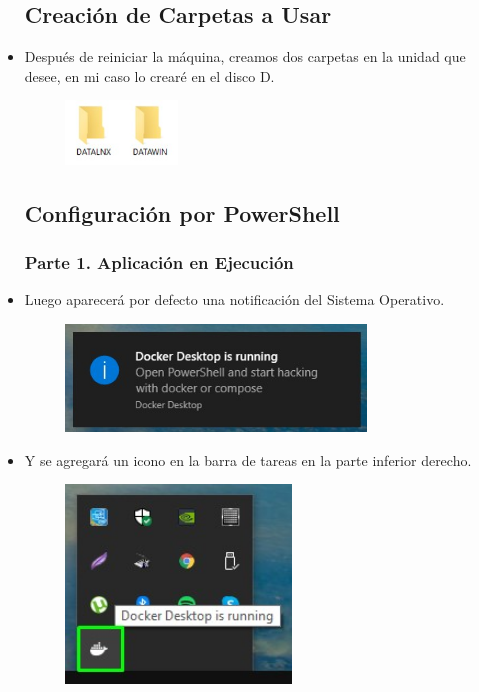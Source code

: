 \begin{itemize}
		\subsection{Creación de Carpetas a Usar}
			\item Después de reiniciar la máquina, creamos dos carpetas en la unidad que desee, en mi caso lo crearé en el disco D.
				\begin{figure}[htb]
					\begin{center}
						\includegraphics[width=3cm]{./Imagenes/CarpetasCreadas}
					\end{center}
				\end{figure}
				\vspace{3cm}
		\subsection{Configuración por PowerShell}
			\subsubsection{Parte 1. Aplicación en Ejecución}
				\item Luego aparecerá por defecto una notificación del Sistema Operativo.
					\begin{figure}[htb]
						\begin{center}
							\includegraphics[width=8cm]{./Imagenes/IniciacionDocker}
						\end{center}
					\end{figure}
				\item Y se agregará un icono en la barra de tareas en la parte inferior derecho.
					\begin{figure}[htb]
						\begin{center}
							\includegraphics[width=6cm]{./Imagenes/IconoDeIniciacion}
						\end{center}
					\end{figure}

\end{itemize}
